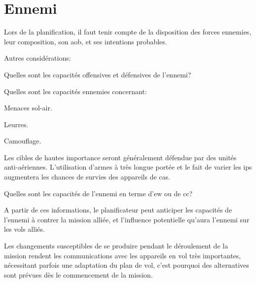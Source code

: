 \section{Ennemi}

Lors de la planification, il faut tenir compte de la disposition des forces ennemies, leur composition, son \gls{aob}, et ses intentions probables.

\begin{e1}
	
	\item Autres considérations:
	
	\begin{e2}
		
		\item Quelles sont les capacités offensives et défensives de l'ennemi?
		
		\item Quelles sont les capacités ennemies concernant:
		
		\begin{e3}
			\item Menaces sol-air.
			\item Leurres.
			\item Camouflage.
		\end{e3}
		
		Les cibles de hautes importance seront généralement défendue par des unités anti-aériennes. L'utilisation d'armes à très longue portée et le fait de varier les \glspl{ip} augmentera les chances de survies des appareils de \gls{cas}.
		
		\item Quelles sont les capacités de l'ennemi en terme d'\gls{ew} ou de \gls{cc}?
		
	\end{e2}
	
	\item A partir de ces informations, le planificateur peut anticiper les capacités de l'ennemi à contrer la mission alliée, et l'influence potentielle qu'aura l'ennemi sur les vols alliés.
	
	Les changements susceptibles de se produire pendant le déroulement de la mission rendent les communications avec les appareils en vol très importantes, nécessitant parfois une adaptation du plan de vol, c'est pourquoi des alternatives sont prévues dès le commencement de la mission.
\end{e1}